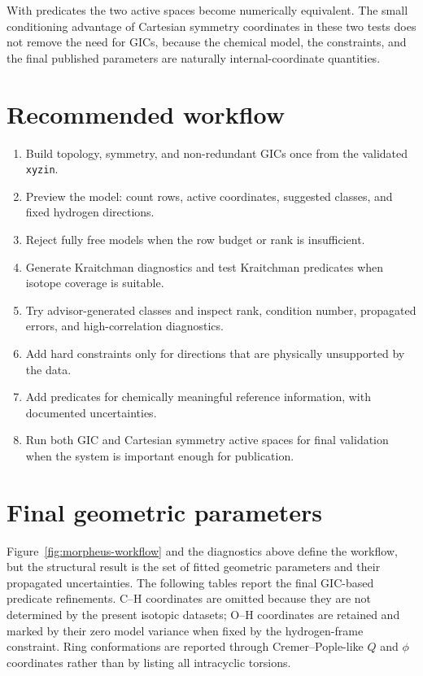 \documentclass[11pt]{article}
\begin{document}
With predicates the two active spaces become numerically equivalent.  The small
conditioning advantage of Cartesian symmetry coordinates in these two tests does not
remove the need for GICs, because the chemical model, the constraints, and the final
published parameters are naturally internal-coordinate quantities.

\section{Recommended workflow}
\begin{enumerate}
  \item Build topology, symmetry, and non-redundant GICs once from the validated
        \texttt{xyzin}.
  \item Preview the model: count rows, active coordinates, suggested classes, and fixed
        hydrogen directions.
  \item Reject fully free models when the row budget or rank is insufficient.
  \item Generate Kraitchman diagnostics and test Kraitchman predicates when isotope
        coverage is suitable.
  \item Try advisor-generated classes and inspect rank, condition number, propagated
        errors, and high-correlation diagnostics.
  \item Add hard constraints only for directions that are physically unsupported by the
        data.
  \item Add predicates for chemically meaningful reference information, with documented
        uncertainties.
  \item Run both GIC and Cartesian symmetry active spaces for final validation when the
        system is important enough for publication.
\end{enumerate}

\section{Final geometric parameters}
Figure~\ref{fig:morpheus-workflow} and the diagnostics above define the workflow, but
the structural result is the set of fitted geometric parameters and their propagated
uncertainties.  The following tables report the final GIC-based predicate refinements.
C--H coordinates are omitted because they are not determined by the present isotopic
datasets; O--H coordinates are retained and marked by their zero model variance when
fixed by the hydrogen-frame constraint.  Ring conformations are reported through
Cremer--Pople-like \(Q\) and \(\phi\) coordinates rather than by listing all
intracyclic torsions.


\end{document}
